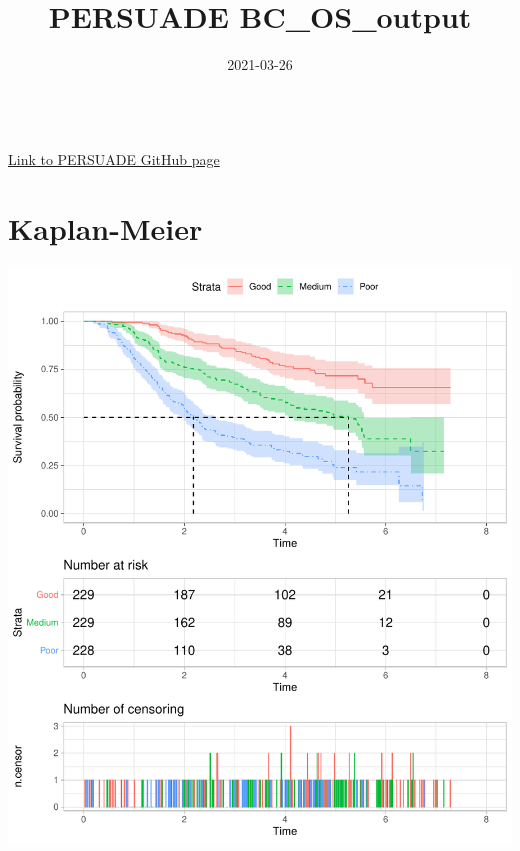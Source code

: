 \documentclass[]{article}
\title{PERSUADE BC\_OS\_output}
\author{}
\date{\vspace{-2.5em}2021-03-26}
\begin{document}
\maketitle

{
\hypersetup{linkcolor=black}
\setcounter{tocdepth}{2}
\tableofcontents
}
~\\
\href{https://github.com/Bram-R/PERSUADE}{Link to PERSUADE GitHub page}
\newpage

\section{Kaplan-Meier}\label{kaplan-meier}

\begin{flushleft}\includegraphics{Images/plot_KM-1} \end{flushleft}
\end{document}
